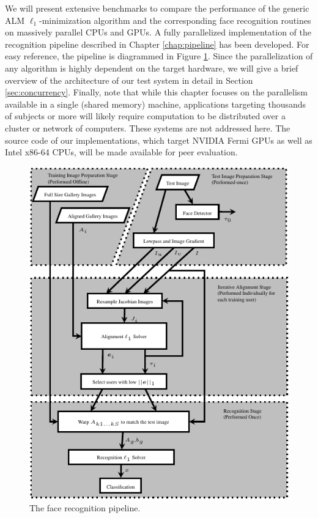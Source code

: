 We will present extensive benchmarks to compare the performance of the
generic ALM $\ell_1$-minimization algorithm and the corresponding face recognition
routines on massively parallel CPUs and GPUs.  
A fully parallelized implementation of the recognition pipeline described in Chapter
\ref{chap:pipeline} has been developed.  For easy reference, the pipeline is 
diagrammed in Figure \ref{fig:pipeline}.
Since the parallelization of any algorithm
is highly dependent on the target hardware, we will give a brief overview of
the architecture of our test system in detail in Section
\ref{sec:concurrency}.
Finally, note that 
while this chapter focuses on the parallelism available in a single (shared memory) machine,
applications targeting thousands of subjects or more will likely require computation to be
distributed over a cluster or network of computers. These systems are not addressed here.
The source code of our implementations, which target NVIDIA Fermi GPUs
as well as Intel x86-64 CPUs, will be made available for peer evaluation.

\begin{figure}
\centering
\includegraphics[scale=1.4]{figures_ijcb/pipeline_simplified.pdf}
\caption{The face recognition pipeline.  }
\label{fig:pipeline}
\end{figure}

